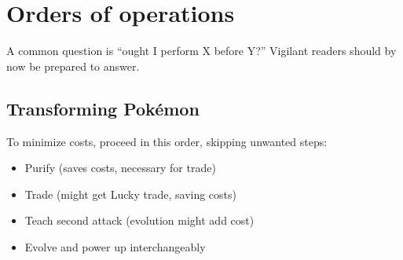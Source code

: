 \chapter{Orders of operations}
\label{chap:ooo}
A common question is ``ought I perform X before Y?''
Vigilant readers should by now be prepared to answer.

\section{Transforming Pokémon}
\label{sec:pokemontransforms}
To minimize costs, proceed in this order, skipping unwanted steps:
\begin{itemize}
\item Purify (saves costs, necessary for trade)
\item Trade (might get Lucky trade, saving costs)
\item Teach second attack (evolution might add cost)
\item Evolve and power up interchangeably
\end{itemize}


